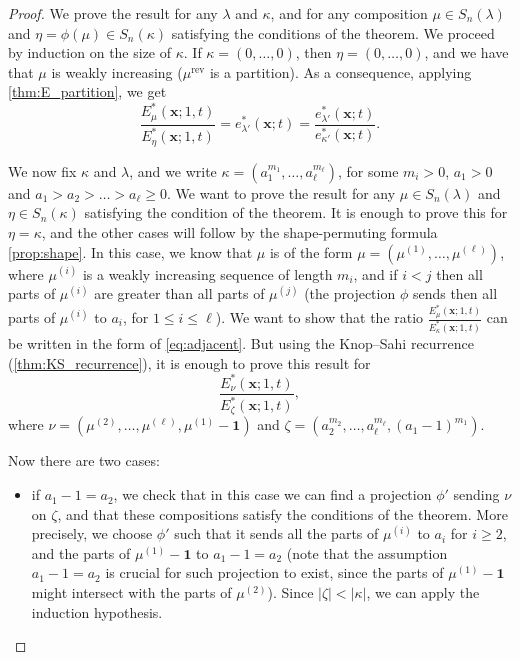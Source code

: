 \documentclass[12pt]{amsart}
\theoremstyle{definition}
\newcommand{\bfx}{\boldsymbol{x}}
\DeclareMathOperator{\rev}{rev}
\def\LW#1{(\textcolor{teal}{LW:#1})}
\def\HBD#1{(\textcolor{violet}{HBD:#1})}
\begin{document}
\begin{appendices}
\begin{proof}
We prove the result for any $\lambda$ and $\kappa$, and for any composition $\mu \in S_n(\lambda)$ and $\eta=\phi(\mu)\in S_n(\kappa)$ satisfying the conditions of the theorem. We proceed by induction on the size of $\kappa$.  If $\kappa=(0,\dots,0)$, then $\eta=(0,\dots,0)$, and we have that $\mu$ is weakly increasing ($\mu^{\rev}$ is a partition). As a consequence, applying \cref{thm:E_partition}, we get
\begin{equation}
    \frac{E^*_\mu(\bfx;1,t)}{E^*_{\eta}(\bfx;1,t)}=e^*_{\lambda'}(\bfx;t)=\frac{e^*_{\lambda'}(\bfx;t)}{e^*_{\kappa'}(\bfx;t)}.
\end{equation}

We now fix $\kappa$ and $\lambda$, and we write $\kappa=(a_1^{m_1},\dots,a_\ell^{m_\ell})$, for some $m_i>0$, $a_1>0$ and $a_1>a_2>\dots>a_\ell\geq 0$. We want to prove the result for any $\mu\in S_n(\lambda)$ and $\eta\in S_n(\kappa)$ satisfying the condition of the theorem. It is enough to prove this for $\eta=\kappa$, and the other cases will follow by the shape-permuting formula \cref{prop:shape}. In this case, we know that $\mu$ is of the form 
$\mu=(\mu^{(1)},\dots,\mu^{(\ell)})$, where $\mu^{(i)}$ is a weakly increasing sequence of length $m_i$, and if $i<j$ then all parts of $\mu^{(i)}$ are greater than all parts of $\mu^{(j)}$ (the projection $\phi$ sends then all parts of $\mu^{(i)}$ to $a_i$, for $1\leq i\leq \ell$).
We want to show that the ratio $\frac{E^*_\mu(\bfx;1,t)}{E^*_{\kappa}(\bfx;1,t)}$ can be written in the form of \cref{eq:adjacent}. But using the Knop–Sahi recurrence (\cref{thm:KS_recurrence}), it is enough to prove this result for
$$\frac{E^*_{\nu}(\bfx;1,t)}{E^*_{\zeta}(\bfx;1,t)},$$
where $\nu=(\mu^{(2)},\dots,\mu^{(\ell)},\mu^{(1)}-\mathbf{1})$ and $\zeta=(a_2^{m_2},\dots,a_\ell^{m_\ell},(a_1-1)^{m_1})$.

Now there are two cases:
\begin{itemize}
    \item if $a_1-1=a_2$, we check that in this case we can find a projection $\phi'$ sending $\nu$ on $\zeta$, and that these compositions satisfy the conditions of the theorem. 
    More precisely, we choose $\phi'$ such that it sends all the parts of $\mu^{(i)}$ to $a_i$ for $i\geq 2$, and the parts of $\mu^{(1)}-\mathbf{1}$ to $a_1-1=a_2$ (note that the assumption $a_1-1=a_2$ is crucial for such projection to exist, since the parts of $\mu^{(1)}-\mathbf{1}$ might intersect with the parts of $\mu^{(2)}$). 
    Since $|\zeta|<|\kappa|$,  we can apply the induction hypothesis.


\end{itemize}
\end{proof}
\end{appendices}
\end{document}
